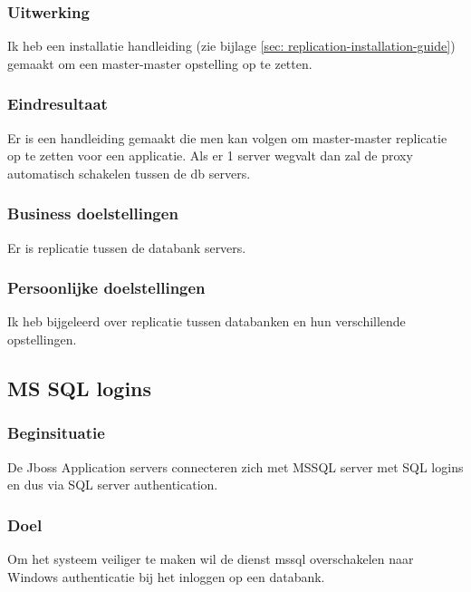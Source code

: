 \subsubsection{Uitwerking}

Ik heb een installatie handleiding (zie bijlage \ref{sec: replication-installation-guide}) gemaakt om een master-master opstelling op te zetten.

\subsubsection{Eindresultaat}

Er is een handleiding gemaakt die men kan volgen om master-master replicatie op te zetten voor een applicatie. Als er 1 server wegvalt dan zal de proxy automatisch schakelen tussen de \gls{db} servers.

\subsubsection{Business doelstellingen}

Er is replicatie tussen de databank servers.

\subsubsection{Persoonlijke doelstellingen}

Ik heb bijgeleerd over replicatie tussen databanken en hun verschillende opstellingen.


\subsection{MS SQL logins}

\subsubsection{Beginsituatie}

De Jboss Application servers connecteren zich met MSSQL server met SQL logins en dus via SQL server authentication.

\subsubsection{Doel}

Om het systeem veiliger te maken wil de dienst \gls{mssql} overschakelen naar Windows authenticatie bij het inloggen op een databank.

